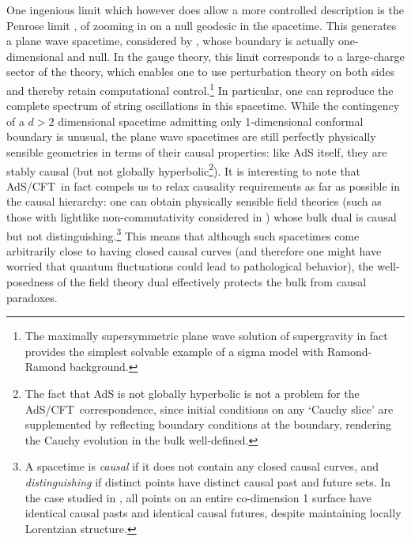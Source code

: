 \documentclass[12pt]{article}
\def\AC{AdS/CFT}
\def\GT{gauge theory}
\begin{document}
One ingenious limit which however does allow a more controlled description is the Penrose limit \cite{penrose1976any}, of zooming in on a null geodesic in the spacetime.  This generates a plane wave spacetime, considered by \cite{Berenstein:2002jq}, whose boundary is actually one-dimensional and null.
 In the \GT, this limit corresponds to a large-charge sector of the theory, which enables one to use perturbation theory on both sides and thereby retain computational control.\footnote{
The maximally supersymmetric plane wave solution of 
supergravity  \cite{Berenstein:2002jq} in fact provides the simplest solvable example of a sigma model with Ramond-Ramond background.}  In particular, one can reproduce the complete spectrum of string oscillations in this spacetime.  
While the contingency of a $d>2$ dimensional spacetime admitting only 1-dimensional conformal boundary is unusual, the plane wave spacetimes are still perfectly physically sensible geometries in terms of their causal properties: like AdS itself, they are stably causal (but not globally hyperbolic\footnote{
The fact that AdS is not globally hyperbolic is not a problem for the \AC\ correspondence, since initial conditions on any `Cauchy slice' are supplemented by reflecting boundary conditions at the boundary, rendering the Cauchy evolution in the bulk well-defined.
}).  It is interesting to note that \AC\ in fact compels us to relax causality requirements as far as possible in the causal hierarchy: one can obtain physically sensible field theories (such as those with lightlike non-commutativity considered in \cite{Hubeny:2005qu}) whose bulk dual is causal but not distinguishing.\footnote{
A spacetime is {\it causal} if it does not contain any closed causal curves, and {\it distinguishing} if distinct points have distinct causal past and future sets.  In the case studied in  \cite{Hubeny:2005qu}, all points on an entire co-dimension 1 surface have identical causal pasts and identical causal futures, despite maintaining locally Lorentzian structure.
} 
This means that although such spacetimes come arbitrarily close to having closed causal curves (and therefore one might have worried that quantum fluctuations could lead to pathological behavior), the well-posedness of the field theory dual effectively protects the bulk from causal paradoxes.
\end{document}
